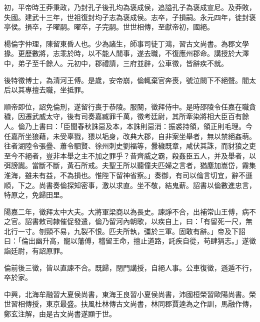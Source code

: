\begin{pinyinscope}
初，平帝時王莽秉政，乃封孔子後孔均為褒成侯，追謚孔子為褒成宣尼。及莽敗，失國。建武十三年，世祖復封均子志為褒成侯。志卒，子損嗣。永元四年，徙封褒亭侯。損卒，子曜嗣。曜卒，子完嗣。世世相傳，至獻帝初，國絕。

楊倫字仲理，陳留東昏人也。少為諸生，師事司徒丁鴻，習古文尚書。為郡文學掾。更歷數將，志乖於時，以不能人閒事，遂去職，不復應州郡命。講授於大澤中，弟子至千餘人。元初中，郡禮請，三府並辟，公車徵，皆辭疾不就。

後特徵博士，為清河王傅。是歲，安帝崩，倫輒棄官奔喪，號泣闕下不絕聲。閻太后以其專擅去職，坐抵罪。

順帝即位，詔免倫刑，遂留行喪于恭陵。服闋，徵拜侍中。是時邵陵令任嘉在職貪穢，因遷武威太守，後有司奏嘉臧罪千萬，徵考廷尉，其所牽染將相大臣百有餘人。倫乃上書曰：「臣聞春秋誅惡及本，本誅則惡消：振裘持領，領正則毛理。今任嘉所坐狼藉，未受辜戮，猥以垢身，改典大郡，自非案坐舉者，無以禁絕姦萌。往者湖陸令張疊、蕭令駟賢、徐州刺史劉福等，釁穢既章，咸伏其誅，而豺狼之吏至今不絕者，豈非本舉之主不加之罪乎？昔齊威之霸，殺姦臣五人，并及舉者，以弭謗讟。當斷不斷，黃石所戒。夫聖王所以聽僮夫匹婦之言者，猶塵加嵩岱，霧集淮海，雖未有益，不為損也。惟陛下留神省察。」奏御，有司以倫言切宜，辭不遜順，下之。尚書奏倫探知密事，激以求直。坐不敬，結鬼薪。詔書以倫數進忠言，特原之，免歸田里。

陽嘉二年，徵拜太中大夫。大將軍梁商以為長史。諫諍不合，出補常山王傅，病不之官。詔書敕司隸催促發遣，倫乃留河內朝歌，以疾自上，曰：「有留死一尺，無北行一寸。刎頸不易，九裂不恨。匹夫所執，彊於三軍。固敢有辭。」帝及下詔曰：「倫出幽升高，寵以藩傅，稽留王命，擅止道路，託疾自從，苟肆狷志。」遂徵詣廷尉，有詔原罪。

倫前後三徵，皆以直諫不合。既歸，閉門講授，自絕人事。公車復徵，遜遁不行，卒於家。

中興，北海牟融習大夏侯尚書，東海王良習小夏侯尚書，沛國桓榮習歐陽尚書。榮世習相傳授，東京最盛。扶風杜林傳古文尚書，林同郡賈逵為之作訓，馬融作傳，鄭玄注解，由是古文尚書遂顯于世。


\end{pinyinscope}